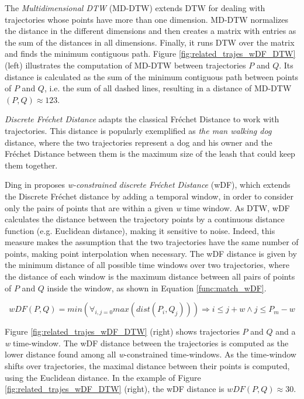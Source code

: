 The \emph{Multidimensional DTW} (MD-DTW) \cite{ten2007multi} extends DTW for dealing with trajectories whose points have more than one dimension. MD-DTW normalizes the distance in the different dimensions and then creates a matrix with entries as the sum of the distances in all dimensions. Finally, it runs DTW over the matrix and finds the minimum contiguous path. Figure \ref{fig:related_trajes_wDF_DTW} (left) illustrates the computation of MD-DTW between trajectories $P$ and $Q$. Its distance is calculated as the sum of the minimum contiguous path between points of $P$ and $Q$, i.e. the sum of all dashed lines, resulting in a distance of MD-DTW$(P, Q) \approx 123$.

\emph{Discrete Fr{\'e}chet Distance} \cite{eiter1994computing} adapts the classical Fr{\'e}chet Distance \cite{Frechet1906} to work with trajectories. This distance is popularly exemplified as \textit{the man walking dog} distance, where the two trajectories represent a dog and his owner and the Fr{\'e}chet Distance between them is the maximum size of the leash that could keep them together.

Ding in \cite{Ding:2008:ESJ:1440463.1440989} proposes \emph{w-constrained discrete Fr{\'e}chet Distance} (wDF), which extends the Discrete Fr{\'e}chet distance \cite{eiter1994computing} by adding a temporal window, in order to consider only the pairs of points that are within a given \emph{w} time window. {As DTW, wDF calculates the distance between the trajectory points by a continuous distance function (e.g. Euclidean distance), making it sensitive to noise}. Indeed, this measure makes the assumption that the two trajectories have the same number of points, making point interpolation when necessary. The wDF distance is given by the minimum distance of all possible time windows over two trajectories, where the distance of each window is the maximum distance between all pairs of points of $P$ and $Q$ inside the window, as shown in Equation \ref{func:match_wDF}.

\begin{equation}
\label{func:match_wDF}
  wDF(P, Q) = min(\forall_{i,j=0}max(dist(P_i, Q_j))) \Rightarrow i \leq j + w \land
  j \leq P_{m} - w
\end{equation}

Figure \ref{fig:related_trajes_wDF_DTW} (right) shows trajectories $P$ and $Q$ and a \emph{w} time-window. The wDF distance between the trajectories is computed as the lower distance found among all \emph{w}-constrained time-windows. As the time-window shifts over trajectories, the maximal distance between their points is computed, using the Euclidean distance. In the example of Figure \ref{fig:related_trajes_wDF_DTW} (right), the wDF distance is $wDF(P, Q) \approx 30$.

